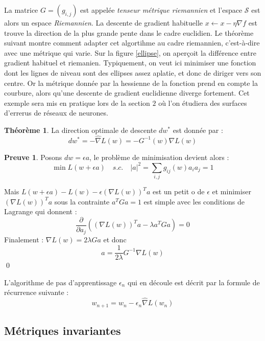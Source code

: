 \documentclass{article}
\theoremstyle{definition}
\newtheorem{thm}{Théorème}
\newtheorem{dem}{Preuve}
\begin{document}
 La matrice $G=(g_{i,j})$ est appelée \textit{tenseur métrique riemannien } et l'espace $\mathcal{S}$ est alors un espace \textit{Riemannien}. La descente de gradient habituelle $x \leftarrow x-\eta \nabla f$ est  trouve la direction de la plus grande pente dans le cadre euclidien. Le théorème suivant montre comment adapter cet algortihme au cadre riemannien, c'est-à-dire avec une métrique qui varie. Sur la figure \ref{ellipse}, on aperçoit la différence entre gradient habituel et riemanien. Typiquement, on veut ici minimiser une fonction dont les lignes de niveau sont des ellipses assez aplatie, et donc de diriger vers son centre. Or la métrique donnée par la hessienne de la fonction prend en compte la courbure, alors qu'une descente de gradient euclidienne diverge fortement. Cet exemple sera mis en pratique lors de la section $2$ où l'on étudiera des surfaces d'errerus de réseaux de neurones.\\


\begin{thm}
La direction optimale de descente $dw^*$ est donnée par :
\[dw^*= -\hat{\nabla}L(w)=-G^{-1}(w) \nabla L(w)\]
\end{thm}

\begin{dem} Posons $dw= \epsilon a $, le problème de minimisation devient alors :
\[\min L(w+\epsilon a) \quad s.c. \quad |a|^2=\sum_{i,j} g_{ij}(w)a_i a_j=1\]

Mais $L(w+\epsilon a) - L(w)-\epsilon (\nabla L(w))^T a $ est un petit o de $\epsilon$ et minimiser $(\nabla L(w))^T a$ sous la contrainte $a^T G a = 1$ est simple avec les conditions de Lagrange qui donnent :
\[\frac{\partial}{\partial a_j}((\nabla L(w))^T a - \lambda a^T G a )=0\]
Finalement : $\nabla L(w) = 2\lambda Ga$ et donc 
\[a=\frac{1}{2\lambda}G^{-1}\nabla L(w)\] \qed
\end{dem}

L'algorithme de pas d'apprentissage $\epsilon_n$ qui en découle est décrit par la formule de récurrence suivante :
\[w_{n+1}=w_n -\epsilon_n \hat{\nabla} L(w_n)\] 

\subsection{Métriques invariantes}
\end{document}
